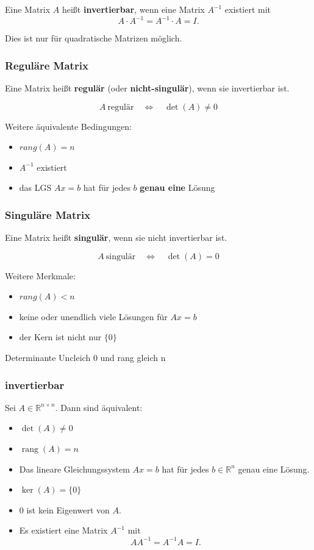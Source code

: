 \documentclass[9pt,a4paper]{article}
\begin{document}
    Eine Matrix $A$ heißt \textbf{invertierbar}, wenn eine Matrix $A^{-1}$ existiert mit
    \[
    A \cdot A^{-1} = A^{-1} \cdot A = I.
    \]
    
    Dies ist nur für quadratische Matrizen möglich.
    
    \subsubsection{Reguläre Matrix}
    Eine Matrix heißt \textbf{regulär} (oder \textbf{nicht-singulär}), wenn sie invertierbar ist.
    
    \[
    A \ \text{regulär} 
    \quad\Longleftrightarrow\quad
    \det(A) \neq 0
    \]
    
    Weitere äquivalente Bedingungen:
    \begin{itemize}
        \item $rang(A)=n$
        \item $A^{-1}$ existiert
        \item das LGS $Ax=b$ hat für jedes $b$ \textbf{genau eine} Lösung
    \end{itemize}
    
    \subsubsection{Singuläre Matrix}
    Eine Matrix heißt \textbf{singulär}, wenn sie nicht invertierbar ist.
    
    \[
    A \ \text{singulär}
    \quad\Longleftrightarrow\quad
    \det(A)=0
    \]
    
    Weitere Merkmale:
    \begin{itemize}
        \item $rang(A)<n$
        \item keine oder unendlich viele Lösungen für $Ax=b$
        \item der Kern ist nicht nur $\{0\}$
    \end{itemize}
    
    Determinante Uncleich 0 und rang gleich n
    \subsubsection{invertierbar}
    Sei $A \in \mathbb{R}^{n\times n}$. Dann sind äquivalent:
    
    \begin{itemize}
        \item $\det(A) \neq 0$
        \item $\operatorname{rang}(A) = n$
        \item Das lineare Gleichungssystem $Ax=b$ hat für jedes $b \in \mathbb{R}^n$ genau eine Lösung.
        \item $\ker(A) = \{0\}$
        \item $0$ ist kein Eigenwert von $A$.
        \item Es existiert eine Matrix $A^{-1}$ mit
        \[
        A A^{-1} = A^{-1} A = I.
        \]
    \end{itemize}
\end{document}
